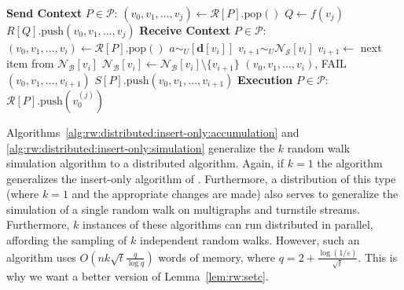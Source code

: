 \documentclass[10]{report}
\newcommand{\push}[1]{\text{push} \left ( #1 \right )}
\newcommand{\pop}{\text{pop}()}
\begin{document}
\begin{algorithm}[htbp]
\begin{flushleft}
\begin{algorithmic}[1]
	\Statex \textbf{Send Context} $P \in \mathcal{P}$:
  			\State $(v_0, v_1, \dots, v_j) \gets \mathcal{R}[P].\pop$
			\State $Q \gets f(v_j)$
			\State $R[Q].\push{v_0, v_1, \dots, v_{j}}$
  		\EndWhile
	\Statex \textbf{Receive Context} $P \in \mathcal{P}$:
  			\State $(v_0, v_1, \dots, v_i) \gets \mathcal{R}[P].\pop$
			\State $a \sim_U [\mathbf{d}[{v_i}]] $
				\State $v_{i+1} \sim_U \mathcal{N}_\mathcal{S}[v_i]$
			\Else
					\State $v_{i+1} \gets$ next item from $\mathcal{N}_\mathcal{B}[v_i]$
					\State $\mathcal{N}_\mathcal{B}[v_i] \gets \mathcal{N}_\mathcal{B}[v_i] \setminus \{v_{i+1}\}$
				\Else
					\State \Return $(v_0, v_1, \dots, v_i)$, FAIL
				\EndIf
			\EndIf
				\State \Return $(v_0, v_1, \dots, v_{i+1})$
			\Else
				\State $S[P].\push{v_0, v_1, \dots, v_{i+1}}$
			\EndIf
  		\EndWhile
	\Statex \textbf{Execution} $P \in \mathcal{P}$:
				\State $\mathcal{R}[P].\push{v_0^{(j)}}$
			\EndIf
		\EndParFor
\end{algorithmic}
\end{flushleft}
\end{algorithm}


Algorithms~\ref{alg:rw:distributed:insert-only:accumulation} and \ref{alg:rw:distributed:insert-only:simulation} generalize the $k$ random walk simulation algorithm to a distributed algorithm. 
Again, if $k=1$ the algorithm generalizes the insert-only algorithm of \cite{jin2018simulating}.
Furthermore, a distribution of this type (where $k=1$ and the appropriate changes are made) also serves to generalize the simulation of a single random walk on multigraphs and turnstile streams.
Furthermore, $k$ instances of these algorithms can run distributed in parallel, affording the sampling of $k$ independent random walks. 
However, such an algorithm uses $O \left (nk\sqrt{t} \frac{q}{\log q} \right )$ words of memory, where $q = 2 + \frac{\log(1/\varepsilon)}{\sqrt{t}}$.
This is why we want a better version of Lemma~\ref{lem:rw:setc}.
\end{document}
